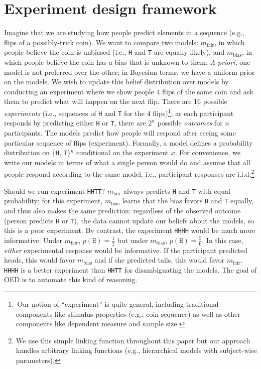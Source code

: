 \documentclass[10pt,letterpaper]{article}
\begin{document}
\section{Experiment design framework}
\label{s:bayes}
Imagine that we are studying how people predict elements in a sequence (e.g., flips of a possibly-trick coin).
We want to compare two models: $m_{\text{fair}}$, in which people believe the coin is unbiased (i.e.,  \lstinline{H} and  \lstinline{T} are equally likely), and $m_{\text{bias}}$, in which people believe the coin has a bias that is unknown  to them.
\emph{A priori}, one model is not preferred over the other; in Bayesian terms, we have a uniform prior on the models.
We wish to update this belief distribution over models by conducting an experiment where we show people 4 flips of the same coin and ask them to predict what will happen on the next flip.
There are 16 possible \emph{experiments} (i.e., sequences of \lstinline{H} and \lstinline{T} for the 4 flips)\footnote{\,Our notion of ``experiment'' is quite general, including traditional components like stimulus properties (e.g., coin sequence) as well as other components like dependent measure and sample size.}; as each participant responds by predicting either \lstinline{H} or \lstinline{T}, there are $2^n$ possible \emph{outcomes} for $n$ participants.
The models predict how people will respond after seeing some particular sequence of flips (experiment).
Formally, a model defines a probability distribution on \{\lstinline{H}, \lstinline{T}\}$^n$ conditional on the experiment $x$.
For convenience, we write our models in terms of what a single person would do and assume that all people respond according to the same model, i.e., participant responses are i.i.d.\footnote{We use this simple linking function throughout this paper but our approach handles arbitrary linking functions (e.g., hierarchical models with subject-wise parameters).}

Should we run experiment \lstinline{HHTT}?
$m_{\text{fair}}$ always predicts \lstinline{H} and \lstinline{T} with equal probability; for this experiment, $m_{\text{bias}}$ learns that the bias favors \lstinline{H} and \lstinline{T} equally, and thus also makes the same prediction: regardless of the observed outcome (person predicts \lstinline{H} or \lstinline{T}), the data cannot update our beliefs about the models, so this is a poor experiment.
By contrast, the experiment \lstinline{HHHH} would be much more informative.
Under $m_{\text{fair}}$, $p(\texttt{H}) = \frac{1}{2}$ but under $m_{\text{bias}}$, $p(\texttt{H}) = \frac{5}{6}$.
In this case, \emph{either} experimental response would be informative.
If the participant predicted heads, this would favor $m_{\text{bias}}$ and if she predicted tails, this would favor $m_{\text{fair}}$.
\lstinline{HHHH} is a better experiment than \lstinline{HHTT} for disambiguating the models.
The goal of OED is to automate this kind of reasoning.
\end{document}
